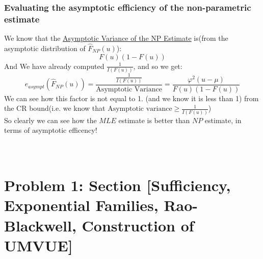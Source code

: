 \documentclass[12pt]{article}
\begin{document}
\subsubsection*{Evaluating the asymptotic efficiency of the non-parametric estimate}
We know that the \underline{Asymptotic Variance of the NP Estimate} is(from the asymptotic distribution of $\hat{F}_{NP}(u)$): 
\[
F(u)(1-F(u))
\]
And We have already computed $\frac{1}{I(F(u))}$, and so we get: 
\[
e_{asympt}(\hat{F}_{NP}(u)) = \frac{\frac{1}{I(F(u))}}{\text{Asymptotic Variance}} = \frac{\varphi^2(u-\mu)}{F(u)(1-F(u))}
\]
We can see how this factor is not equal to 1. (and we know it is less than 1) from the CR bound(i.e. we know that $\text{Asymptotic variance}\geq \frac{1}{I(F(u))}$)\\ 
So clearly we can see how the $MLE$ estimate is better than $NP$ estimate, in terms of asymptotic efficency! \\ \\ \\ 
\section*{Problem 1: Section [Sufficiency, Exponential Families, Rao-Blackwell, Construction of UMVUE]}
\end{document}

